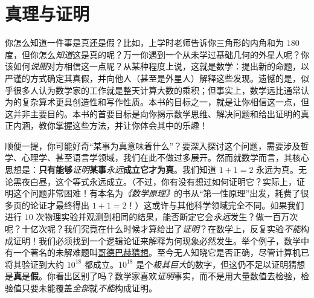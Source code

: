 \section{真理与证明}\label{sec:section1.1}

你怎么知道一件事是真还是假？比如，上学时老师告诉你三角形的内角和为 $180$ 度，但你怎么\emph{知道}这是真的呢？万一你遇到一个从未学过基础几何的外星人呢？你该如何\emph{说服}对方相信这一点呢？从某种程度上说，这就是数学：提出新的命题，以严谨的方式确定其真假，并向他人（甚至是外星人）解释这些发现。遗憾的是，似乎很多人认为数学家的工作就是整天计算大数的乘积；但事实上，数学远比通常认为的复杂算术更具创造性和写作性质。本书的目标之一，就是让你相信这一点，但这并非主要目的。本书的首要目标是向你揭示数学思维、解决问题和给出证明的真正内涵，教你掌握这些方法，并让你体会其中的乐趣！

顺便一提，你可能好奇``某事为真意味着什么''？要深入探讨这个问题，需要涉及哲学、心理学、甚至语言学领域，我们在此不做过多展开。然而就数学而言，其核心思想是：\textbf{只有能够}\emph{证明}\textbf{某事}\emph{永远}\textbf{成立它才为真}。我们知道 $1+1=2$ 永远为真。无论黑夜白昼，这个等式永远成立。（不过，你有没有想过如何证明它？实际上，证明这个问题非常困难！有本名为\emph{《数学原理》}的书从``第一性原理''出发，耗费了很多页的论证才最终得出 $1+1=2$！）这或许与其他科学领域完全不同。如果我们进行 $10$ 次物理实验并观测到相同的结果，能否断定它会\emph{永远}发生？做一百万次呢？十亿次呢？我们究竟在什么时候才算给出了\emph{证明}？在数学上，反复实验\emph{不能}构成证明！我们必须找到一个逻辑论证来解释为何现象必然发生。举个例子，数学中有一个著名的未解难题叫\href{https://baike.baidu.com/item/哥德巴赫猜想/72364}{哥德巴赫猜想}。至今无人知晓它是否正确，尽管计算机已将其验证到大约 $10^{18}$ 都成立。$10^{18}$ 是个\emph{极其巨大}的数字，但这仍不足以证明猜想是\textbf{真}是\textbf{假}。你看出区别了吗？数学家喜欢\emph{证明}事实，而不是用大量数值去检验，检验值只要未能覆盖\emph{全部}就\emph{不能}构成证明。





